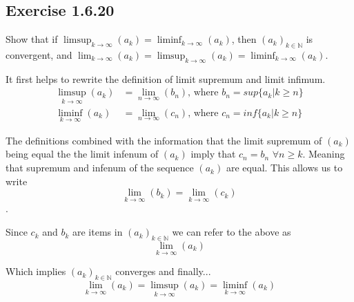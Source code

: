 \documentclass{tufte-book}
\theoremstyle{mytheoremstyle}
\theoremstyle{mylemstyle}
\theoremstyle{mydefstyle}
\begin{document}
\subsection{Exercise 1.6.20}
Show that if  $\limsup_{k \to \infty}(a_k) = \liminf_{k \to \infty}(a_k)$, then $(a_k)_{k \in \mathbb{N}}$ is convergent, and $\lim_{k \to \infty}(a_k) = \limsup_{k \to \infty}(a_k) = \liminf_{k \to \infty}(a_k)$.

It first helps to rewrite the definition of limit supremum and limit infimum.
\begin{align*}
	\limsup_{k \to \infty}(a_k) &= \lim_{n \to \infty}(b_n) \text{, where } b_n = sup\{a_k | k \geq n\} \\
    \liminf_{k \to \infty}(a_k) &= \lim_{n \to \infty}(c_n) \text{, where } c_n = inf\{a_k| k \geq n\}
\end{align*}

The definitions combined with the information that the limit supremum of $(a_k)$ being equal the the limit infenum of $(a_k)$ imply that $c_n = b_n$ $\forall n \geq k$.  Meaning that supremum and infenum of the sequence $(a_k)$ are equal.  This allows us to write
\[\lim_{k \to \infty}(b_k) = \lim_{k \to \infty}(c_k) \].  

Since $c_k$ and $b_k$ are items in $(a_k)_{k \in \mathbb{N}}$ we can refer to the above as 
\[\lim_{k \to \infty}(a_k)\] 

  Which implies $(a_k)_{k \in \mathbb{N}}$ converges and finally...
\[\lim_{k \to \infty}(a_k) = \limsup_{k \to \infty}(a_k) = \liminf_{k \to \infty}(a_k) \]
\end{document}
